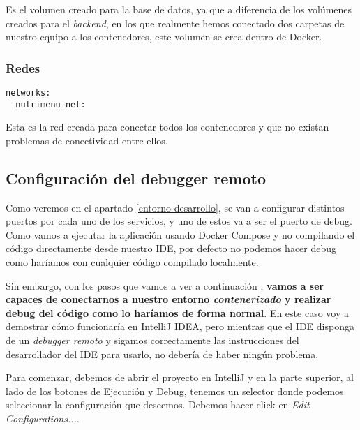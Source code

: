 Es el volumen creado para la base de datos, ya que a diferencia de los volúmenes creados para el \textit{backend}, en los que realmente hemos conectado dos carpetas de nuestro equipo a los contenedores, este volumen se crea dentro de Docker.

\subsubsection{Redes}

\begin{lstlisting}
networks:
  nutrimenu-net:
\end{lstlisting}

Esta es la red creada para conectar todos los contenedores y que no existan problemas de conectividad entre ellos.

\subsection{Configuración del debugger remoto}

Como veremos en el apartado \ref{entorno-desarrollo}, se van a configurar distintos puertos por cada uno de los servicios, y uno de estos va a ser el puerto de debug. Como vamos a ejecutar la aplicación usando Docker Compose y no compilando el código directamente desde nuestro IDE, por defecto no podemos hacer debug como haríamos con cualquier código compilado localmente. 

Sin embargo, con los pasos que vamos a ver a continuación \cite{medium:spring-boot-in-docker}, \textbf{vamos a ser capaces de conectarnos a nuestro entorno \textit{contenerizado} y realizar debug del código como lo haríamos de forma normal}. En este caso voy a demostrar cómo funcionaría en IntelliJ IDEA, pero mientras que el IDE disponga de un \textit{debugger remoto} y sigamos correctamente las instrucciones del desarrollador del IDE para usarlo, no debería de haber ningún problema.


Para comenzar, debemos de abrir  el proyecto en IntelliJ y en la parte superior, al lado de los botones de Ejecución y Debug, tenemos un selector donde podemos seleccionar la configuración que deseemos. Debemos hacer click en \textit{Edit Configurations...}.


